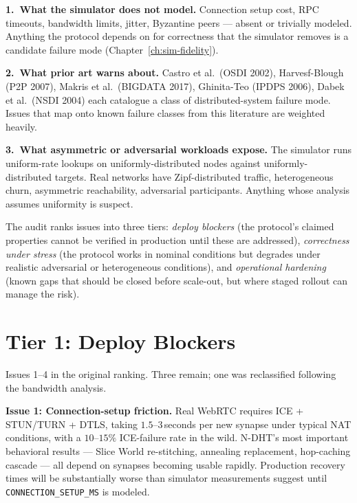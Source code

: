 \documentclass[twoside,nobib]{tufte-book}
\newcommand{\NDHT}{N-DHT\xspace}
\begin{document}
\textbf{1.\ What the simulator does not model.} Connection
setup cost, RPC timeouts, bandwidth limits, jitter, Byzantine
peers --- absent or trivially modeled. Anything the protocol
depends on for correctness that the simulator removes is a
candidate failure mode (Chapter~\ref{ch:sim-fidelity}).

\textbf{2.\ What prior art warns about.} Castro et al.\ (OSDI
2002), Harvesf-Blough (P2P 2007), Makris et al.\ (BIGDATA 2017),
Ghinita-Teo (IPDPS 2006), Dabek et al.\ (NSDI 2004) each
catalogue a class of distributed-system failure mode. Issues
that map onto known failure classes from this literature are
weighted heavily.

\textbf{3.\ What asymmetric or adversarial workloads expose.}
The simulator runs uniform-rate lookups on uniformly-distributed
nodes against uniformly-distributed targets. Real networks have
Zipf-distributed traffic, heterogeneous churn, asymmetric
reachability, adversarial participants. Anything whose analysis
assumes uniformity is suspect.

The audit ranks issues into three tiers: \emph{deploy blockers}
(the protocol's claimed properties cannot be verified in
production until these are addressed), \emph{correctness under
stress} (the protocol works in nominal conditions but degrades
under realistic adversarial or heterogeneous conditions), and
\emph{operational hardening} (known gaps that should be closed
before scale-out, but where staged rollout can manage the
risk).

\section{Tier 1: Deploy Blockers}

Issues 1--4 in the original ranking. Three remain; one was
reclassified following the bandwidth analysis.

\textbf{Issue 1: Connection-setup friction.} Real WebRTC
requires ICE + STUN/TURN + DTLS, taking $1.5$--$3$\,seconds per
new synapse under typical NAT conditions, with a $10$--$15\%$
ICE-failure rate in the wild. \NDHT's most important
behavioral results --- Slice World re-stitching, annealing
replacement, hop-caching cascade --- all depend on synapses
becoming usable rapidly. Production recovery times will be
substantially worse than simulator measurements suggest until
\texttt{CONNECTION\_SETUP\_MS} is modeled.
\end{document}
